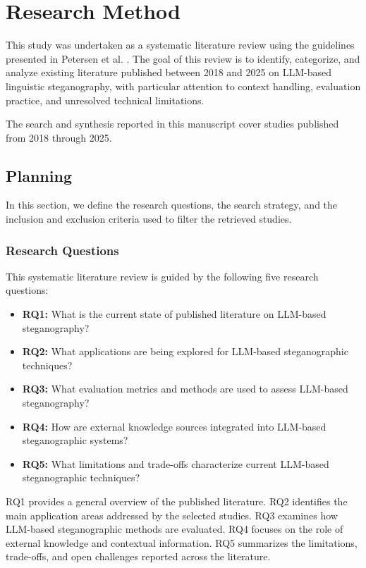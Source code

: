 \section{Research Method}\label{sec:design}

This study was undertaken as a systematic literature review using the guidelines presented in
Petersen et al. \cite{slr_guidelines}. The goal of this review is to identify, categorize, and analyze existing literature
published between 2018 and 2025 on LLM-based linguistic steganography, with particular attention to context handling, evaluation practice, and unresolved technical limitations.

The search and synthesis reported in this manuscript cover studies published from 2018 through 2025.

\subsection{Planning}

In this section, we define the research questions, the search strategy, and the inclusion and exclusion criteria used to filter the retrieved studies.

\subsubsection{Research Questions}
This systematic literature review is guided by the following five research questions:
\begin{itemize}
	\item \textbf{RQ1:} What is the current state of published literature on LLM-based steganography?
	\item \textbf{RQ2:} What applications are being explored for LLM-based steganographic techniques?
	\item \textbf{RQ3:} What evaluation metrics and methods are used to assess LLM-based steganography?
	\item \textbf{RQ4:} How are external knowledge sources integrated into LLM-based steganographic systems?
	\item \textbf{RQ5:} What limitations and trade-offs characterize current LLM-based steganographic techniques?
\end{itemize}

RQ1 provides a general overview of the published literature. RQ2 identifies the main application areas addressed by the selected studies. RQ3 examines how LLM-based steganographic methods are evaluated. RQ4 focuses on the role of external knowledge and contextual information. RQ5 summarizes the limitations, trade-offs, and open challenges reported across the literature.

